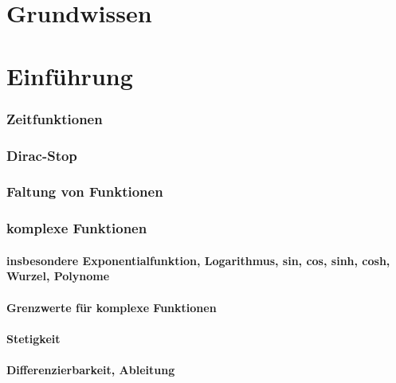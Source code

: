 \documentclass[a4paper]{article}
\author{\pProfessor}
\title{\pTitle}
\begin{document}
\maketitle
\newpage
\tableofcontents
\newpage
\listoffigures
\newpage

\theoremstyle{definition}
\newtheorem{satz}{Satz}[section] 
\newtheorem{definition}{Definition}[section] 
\newtheorem{lemma}{Lemma}[section] 
\newtheorem{behauptung}{Behauptung}[section] 
\newtheorem{beispiel}{Beispiel}
\newenvironment{beweis}{\begin{proof}}{\end{proof}} %

\part{Grundwissen}
\part{Einführung}
\section{Zeitfunktionen}
\section{Dirac-Stop}
\section{Faltung von Funktionen}
\section{komplexe Funktionen}
\subsection{insbesondere Exponentialfunktion, Logarithmus, sin, cos, sinh, cosh, Wurzel, Polynome}
\subsection{Grenzwerte für komplexe Funktionen}
\subsection{Stetigkeit}
\subsection{Differenzierbarkeit, Ableitung}
\end{document}
